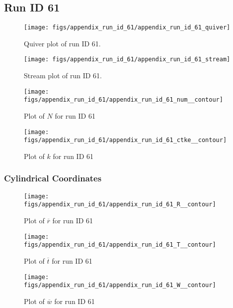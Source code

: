 \subsection{Run ID 61}
\begin{figure}[H]
\centering
\texttt{[image: figs/appendix\_run\_id\_61/appendix\_run\_id\_61\_quiver]}
\caption{Quiver plot of run ID 61.}
\label{fig:appendix_run_id_61_quiver}
\end{figure}


\begin{figure}[H]
\centering
\texttt{[image: figs/appendix\_run\_id\_61/appendix\_run\_id\_61\_stream]}
\caption{Stream plot of run ID 61.}
\label{fig:appendix_run_id_61_stream}
\end{figure}


\begin{figure}[H]
\centering
\texttt{[image: figs/appendix\_run\_id\_61/appendix\_run\_id\_61\_num\_\_contour]}
\caption{Plot of $N$ for run ID 61}
\label{fig:appendix_run_id_61_num__contour}
\end{figure}


\begin{figure}[H]
\centering
\texttt{[image: figs/appendix\_run\_id\_61/appendix\_run\_id\_61\_ctke\_\_contour]}
\caption{Plot of $k$ for run ID 61}
\label{fig:appendix_run_id_61_ctke__contour}
\end{figure}


\subsubsection{Cylindrical Coordinates}
\begin{figure}[H]
\centering
\texttt{[image: figs/appendix\_run\_id\_61/appendix\_run\_id\_61\_R\_\_contour]}
\caption{Plot of $\overline{r}$ for run ID 61}
\label{fig:appendix_run_id_61_R__contour}
\end{figure}


\begin{figure}[H]
\centering
\texttt{[image: figs/appendix\_run\_id\_61/appendix\_run\_id\_61\_T\_\_contour]}
\caption{Plot of $\overline{t}$ for run ID 61}
\label{fig:appendix_run_id_61_T__contour}
\end{figure}


\begin{figure}[H]
\centering
\texttt{[image: figs/appendix\_run\_id\_61/appendix\_run\_id\_61\_W\_\_contour]}
\caption{Plot of $\overline{w}$ for run ID 61}
\label{fig:appendix_run_id_61_W__contour}
\end{figure}


